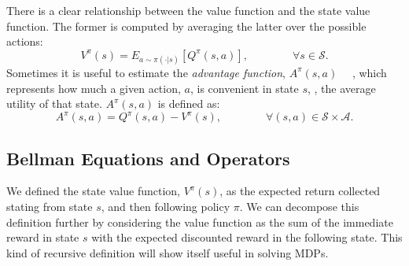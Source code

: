 There is a clear relationship between the value function and the state value function. The former is computed by averaging the latter over the possible actions:
\begin{equation}
	V^\pi(s)=E_{a \sim \pi(\cdot|s)}\left[Q^\pi(s,a)\right], \qquad\qquad \forall s \in \mathcal{S}.
\end{equation}
Sometimes it is useful to estimate the \emph{advantage function}, $A^\pi(s,a)$ ~\cite{LeemonCBaird93}~\cite{SchulmanMLJA15}, which represents how much a given action, $a$, is convenient in state $s$, \wrt, the average utility of that state. $A^\pi(s,a)$ is defined as:
\begin{equation}
		A^\pi(s,a)=Q^\pi(s,a)-V^\pi(s), \qquad \qquad \forall (s,a)\in \mathcal{S} \times \mathcal{A}.
\end{equation}
\subsection{Bellman Equations and Operators}
We defined the state value function, $V^\pi(s)$, as the expected return collected stating from state $s$, and then following policy $\pi$. We can decompose this definition further by considering the value function as the sum of the immediate reward in state $s$ with the expected discounted reward in the following state. This kind of recursive definition will show itself useful in solving MDPs.

